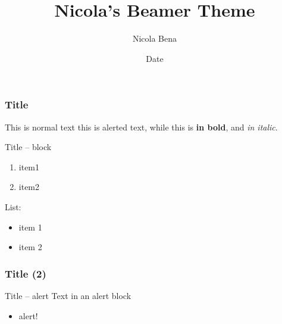 \documentclass{beamer}
\title{Nicola's Beamer Theme}
\date{Date}
\author{Nicola Bena}
\begin{document}
\begin{frame}
    \titlepage
\end{frame}

\begin{frame}
    \frametitle{Title}
    This is normal text \alert{this is alerted text}, while this is \textbf{in bold},
    and \textit{in italic}.

    \begin{block}{Title -- block}
        \begin{enumerate}
            \item item1
            \item item2
        \end{enumerate}
    \end{block}

    List:
    \begin{itemize}
        \item item 1
        \item item 2
    \end{itemize}
\end{frame}

\begin{frame}
    \frametitle{Title (2)}

    \begin{alertblock}{Title -- alert}
        Text in an alert block
        \begin{itemize}
            \item alert!
        \end{itemize}
        
    \end{alertblock}
\end{frame}

    
\end{document}
